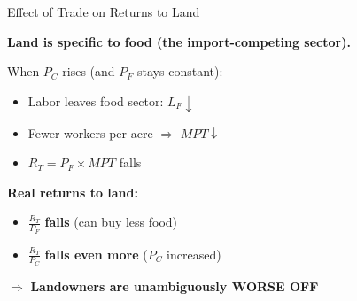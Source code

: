 \documentclass{beamer}
\begin{document}

\begin{frame}{Effect of Trade on Returns to Land}

\textbf{Land is specific to food (the import-competing sector).}

\vspace{0.3cm}

When $P_C$ rises (and $P_F$ stays constant):

\begin{itemize}
    \item Labor leaves food sector: $L_F \downarrow$
    
    \vspace{0.2cm}
    
    \item Fewer workers per acre $\Rightarrow$ $MPT \downarrow$
    
    \vspace{0.2cm}
    
    \item $R_T = P_F \times MPT$ falls
\end{itemize}

\vspace{0.3cm}

\textbf{Real returns to land:}
\begin{itemize}
    \item $\frac{R_T}{P_F}$ \textbf{falls} (can buy less food)
    \item $\frac{R_T}{P_C}$ \textbf{falls even more} ($P_C$ increased)
\end{itemize}

\vspace{0.3cm}

$\Rightarrow$ \textcolor{landcolor}{\textbf{Landowners are unambiguously WORSE OFF}}

\end{frame}

\end{document}
